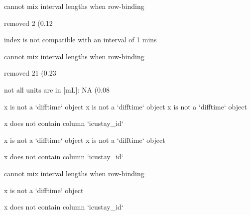 \documentclass[
]{jss}
\begin{document}
\begin{CodeChunk}
\begin{CodeOutput}
cannot mix interval lengths when row-binding
\end{CodeOutput}

\begin{CodeOutput}
removed 2 (0.12%
\end{CodeOutput}

\begin{CodeOutput}
index is not compatible with an interval of 1 mins
\end{CodeOutput}

\begin{CodeOutput}
cannot mix interval lengths when row-binding
\end{CodeOutput}

\begin{CodeOutput}
removed 21 (0.23%
\end{CodeOutput}

\begin{CodeOutput}
not all units are in [mL]: NA (0.08%
\end{CodeOutput}

\begin{CodeOutput}
x is not a `difftime` object
x is not a `difftime` object
x is not a `difftime` object
\end{CodeOutput}

\begin{CodeOutput}
x does not contain column `icustay_id`
\end{CodeOutput}

\begin{CodeOutput}
x is not a `difftime` object
x is not a `difftime` object
\end{CodeOutput}

\begin{CodeOutput}
x does not contain column `icustay_id`
\end{CodeOutput}

\begin{CodeOutput}
cannot mix interval lengths when row-binding
\end{CodeOutput}

\begin{CodeOutput}
x is not a `difftime` object
\end{CodeOutput}

\begin{CodeOutput}
x does not contain column `icustay_id`
\end{CodeOutput}


\end{CodeChunk}
\end{document}
